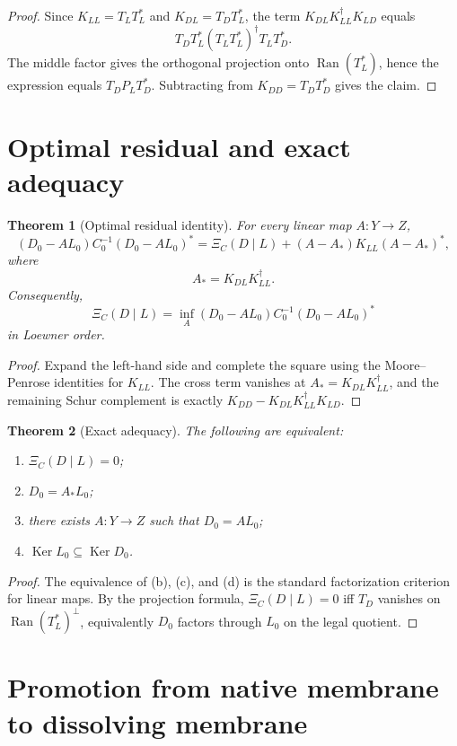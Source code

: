 \documentclass[11pt]{article}
\newtheorem{theorem}{Theorem}[section]
\newcommand{\Ran}{\operatorname{Ran}}
\newcommand{\Ker}{\operatorname{Ker}}
\begin{document}
\begin{proof}
Since \(K_{LL}=T_LT_L^*\) and \(K_{DL}=T_DT_L^*\), the term
\(K_{DL}K_{LL}^{\dagger}K_{LD}\) equals
\[
T_DT_L^*(T_LT_L^*)^{\dagger}T_LT_D^*.
\]
The middle factor gives the orthogonal projection onto \(\Ran(T_L^*)\), hence the expression equals \(T_DP_LT_D^*\).  Subtracting from \(K_{DD}=T_DT_D^*\) gives the claim.
\end{proof}

\section{Optimal residual and exact adequacy}

\begin{theorem}[Optimal residual identity]
For every linear map \(A:Y\to Z\),
\[
\boxed{
(D_0-AL_0)C_0^{-1}(D_0-AL_0)^*
=
\Xi_C(D\mid L)+(A-A_*)K_{LL}(A-A_*)^*,
}
\]
where
\[
A_*=K_{DL}K_{LL}^{\dagger}.
\]
Consequently,
\[
\boxed{
\Xi_C(D\mid L)=\inf_A (D_0-AL_0)C_0^{-1}(D_0-AL_0)^*
}
\]
in Loewner order.
\end{theorem}

\begin{proof}
Expand the left-hand side and complete the square using the Moore--Penrose identities for \(K_{LL}\).  The cross term vanishes at \(A_*=K_{DL}K_{LL}^{\dagger}\), and the remaining Schur complement is exactly \(K_{DD}-K_{DL}K_{LL}^{\dagger}K_{LD}\).
\end{proof}

\begin{theorem}[Exact adequacy]
The following are equivalent:
\begin{enumerate}[label=(\alph*),leftmargin=2em]
\item \(\Xi_C(D\mid L)=0\);
\item \(D_0=A_*L_0\);
\item there exists \(A:Y\to Z\) such that \(D_0=AL_0\);
\item \(\Ker L_0\subseteq\Ker D_0\).
\end{enumerate}
\end{theorem}

\begin{proof}
The equivalence of (b), (c), and (d) is the standard factorization criterion for linear maps.  By the projection formula, \(\Xi_C(D\mid L)=0\) iff \(T_D\) vanishes on \(\Ran(T_L^*)^\perp\), equivalently \(D_0\) factors through \(L_0\) on the legal quotient.
\end{proof}

\section{Promotion from native membrane to dissolving membrane}
\end{document}

